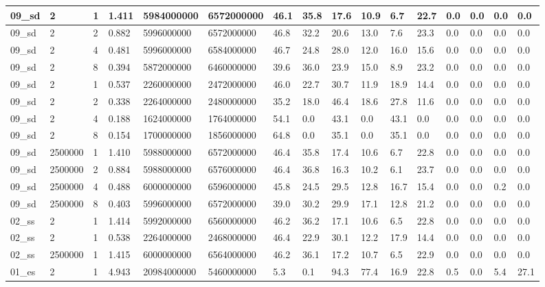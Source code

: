 \documentclass[12pt]{article}
\begin{document}
\begin{flushleft}
\begin{landscape}
\begin{tabular}{| l | l | l | l | l | l | l | l | l | l | l | l | l | l | l | l |}
		09\_sd & 2 & 1 & 1.411 & 5984000000 & 6572000000 & 46.1 & 35.8 & 17.6 & 10.9 & 6.7 & 22.7 & 0.0 & 0.0 & 0.0 & 0.0 \\ \hline
		09\_sd & 2 & 2 & 0.882 & 5996000000 & 6572000000 & 46.8 & 32.2 & 20.6 & 13.0 & 7.6 & 23.3 & 0.0 & 0.0 & 0.0 & 0.0 \\ \hline
		09\_sd & 2 & 4 & 0.481 & 5996000000 & 6584000000 & 46.7 & 24.8 & 28.0 & 12.0 & 16.0 & 15.6 & 0.0 & 0.0 & 0.0 & 0.0 \\ \hline
		09\_sd & 2 & 8 & 0.394 & 5872000000 & 6460000000 & 39.6 & 36.0 & 23.9 & 15.0 & 8.9 & 23.2 & 0.0 & 0.0 & 0.0 & 0.0 \\ \hline
		09\_sd & 2 & 1 & 0.537 & 2260000000 & 2472000000 & 46.0 & 22.7 & 30.7 & 11.9 & 18.9 & 14.4 & 0.0 & 0.0 & 0.0 & 0.0 \\ \hline
		09\_sd & 2 & 2 & 0.338 & 2264000000 & 2480000000 & 35.2 & 18.0 & 46.4 & 18.6 & 27.8 & 11.6 & 0.0 & 0.0 & 0.0 & 0.0 \\ \hline
		09\_sd & 2 & 4 & 0.188 & 1624000000 & 1764000000 & 54.1 & 0.0 & 43.1 & 0.0 & 43.1 & 0.0 & 0.0 & 0.0 & 0.0 & 0.0 \\ \hline
		09\_sd & 2 & 8 & 0.154 & 1700000000 & 1856000000 & 64.8 & 0.0 & 35.1 & 0.0 & 35.1 & 0.0 & 0.0 & 0.0 & 0.0 & 0.0 \\ \hline
		09\_sd & 2500000 & 1 & 1.410 & 5988000000 & 6572000000 & 46.4 & 35.8 & 17.4 & 10.6 & 6.7 & 22.8 & 0.0 & 0.0 & 0.0 & 0.0 \\ \hline
		09\_sd & 2500000 & 2 & 0.884 & 5988000000 & 6576000000 & 46.4 & 36.8 & 16.3 & 10.2 & 6.1 & 23.7 & 0.0 & 0.0 & 0.0 & 0.0 \\ \hline
		09\_sd & 2500000 & 4 & 0.488 & 6000000000 & 6596000000 & 45.8 & 24.5 & 29.5 & 12.8 & 16.7 & 15.4 & 0.0 & 0.0 & 0.2 & 0.0 \\ \hline
		09\_sd & 2500000 & 8 & 0.403 & 5996000000 & 6572000000 & 39.0 & 30.2 & 29.9 & 17.1 & 12.8 & 21.2 & 0.0 & 0.0 & 0.0 & 0.0 \\ \hline
		02\_ss & 2 & 1 & 1.414 & 5992000000 & 6560000000 & 46.2 & 36.2 & 17.1 & 10.6 & 6.5 & 22.8 & 0.0 & 0.0 & 0.0 & 0.0 \\ \hline
		02\_ss & 2 & 1 & 0.538 & 2264000000 & 2468000000 & 46.4 & 22.9 & 30.1 & 12.2 & 17.9 & 14.4 & 0.0 & 0.0 & 0.0 & 0.0 \\ \hline
		02\_ss & 2500000 & 1 & 1.415 & 6000000000 & 6564000000 & 46.2 & 36.1 & 17.2 & 10.7 & 6.5 & 22.9 & 0.0 & 0.0 & 0.0 & 0.0 \\ \hline
		01\_es & 2 & 1 & 4.943 & 20984000000 & 5460000000 & 5.3 & 0.1 & 94.3 & 77.4 & 16.9 & 22.8 & 0.5 & 0.0 & 5.4 & 27.1 \\ \hline

\end{tabular}
\end{landscape}
\end{flushleft}
\end{document}
